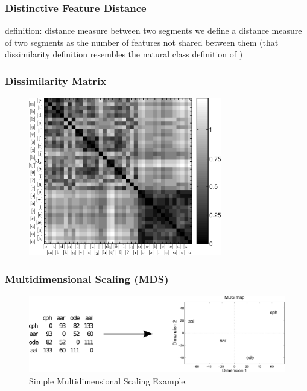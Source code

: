 \documentclass[notes]{beamer}
\begin{document}
\frame
{
  \frametitle{Distinctive Feature Distance}
  
  \begin{block}{definition: distance measure between two segments}
  we define a distance measure of two segments as the number of features not shared between
  them (that dissimilarity definition resembles the natural class definition of \cite{flemming2005})
  \end{block}
}

\frame
{
  \frametitle{Dissimilarity Matrix}
  \vspace{-0.25cm}
  \begin{figure}[h]
  \centering
  \includegraphics[width=0.75\textwidth]{imagespresentation/dissimilarity_en_matrix.png}
  \end{figure}
}

\frame
{
  \frametitle{Multidimensional Scaling (MDS)}
  \begin{figure}[h]
  \centering
  \includegraphics[width=\textwidth]{imagespresentation/mdsex.pdf}
  \caption{Simple Multidimensional Scaling Example.}
  \end{figure}
}
\end{document}
